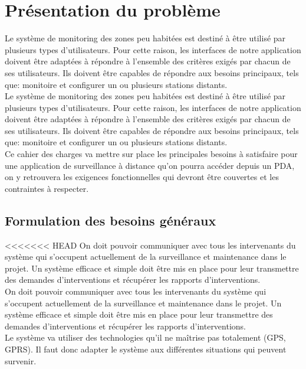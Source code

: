 \section{Présentation du problème}



Le système de monitoring des zones peu habitées est destiné à être utilisé par plusieurs types 
d'utilisateurs. Pour cette raison, les interfaces de notre application doivent être adaptées à 
répondre à l'ensemble des critères exigés par chacun de ses utilisateurs.
Ils doivent être capables de répondre aux besoins principaux, tels que: monitoire et configurer 
un ou plusieurs stations distants.\\

Le système de monitoring des zones peu habitées est destiné à être utilisé par plusieurs types d'utilisateurs. Pour cette raison, les interfaces de notre application doivent être adaptées à répondre à l'ensemble des critères exigés par chacun de ses utilisateurs.
Ils doivent être capables de répondre aux besoins principaux, tels que: monitoire et configurer un ou plusieurs stations distants.\\


Ce cahier des charges va mettre sur place les principales besoins à satisfaire pour une application 
de surveillance à distance qu'on pourra accéder depuis un PDA, on y retrouvera les exigences 
fonctionnelles qui devront être couvertes et les contraintes à respecter.


\subsection{Formulation des besoins généraux}


<<<<<<< HEAD
On doit pouvoir communiquer avec tous les intervenants du système qui s'occupent actuellement de 
la surveillance et maintenance dans le projet. Un système efficace et simple doit être mis en place 
pour leur transmettre des demandes d'interventions et récupérer les rapports d'interventions.\\

On doit pouvoir communiquer avec tous les intervenants du système qui s'occupent actuellement de la surveillance et maintenance dans le projet. Un système efficace et simple doit être mis en place pour leur transmettre des demandes d'interventions et récupérer les rapports d'interventions.\\


Le système va utiliser des technologies qu'il ne maîtrise pas totalement (GPS, GPRS). Il faut donc 
adapter le système aux différentes situations qui peuvent survenir.\\

